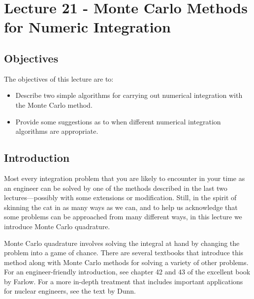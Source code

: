 \chapter{Lecture 21 - Monte Carlo Methods for Numeric Integration}
\label{ch:lec21n}
\section{Objectives}
The objectives of this lecture are to:
\begin{itemize}
\item Describe two simple algorithms for carrying out numerical integration with the Monte Carlo method.
\item Provide some suggestions as to when different numerical integration algorithms are appropriate.
\end{itemize}
\setcounter{lstannotation}{0}
\section{Introduction}
Most every integration problem that you are likely to encounter in your time as an engineer can be solved by one of the methods described in the last two lectures---possibly with some extensions or modification.  Still, in the spirit of skinning the cat in as many ways as we can, and to help us acknowledge that some problems can be approached from many different ways, in this lecture we introduce Monte Carlo quadrature.

Monte Carlo quadrature involves solving the integral at hand by changing the problem into a game of chance.  There are several textbooks that introduce this method along with Monte Carlo methods for solving a variety of other problems.  For an engineer-friendly introduction, see chapter 42 and 43 of the excellent book by Farlow.\cite{farlow1993partial}  For a more in-depth treatment that includes important applications for nuclear engineers, see the text by Dunn.\cite{dunn2022exploring}

